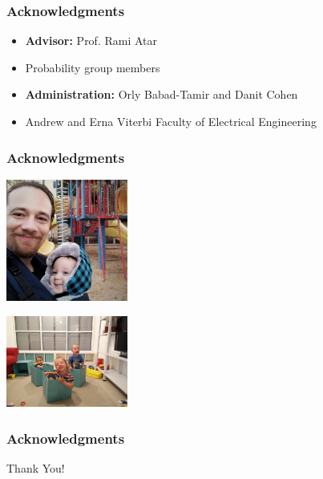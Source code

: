 \documentclass{beamer}
\begin{document}
\begin{frame}
  \frametitle{Acknowledgments}
  
\vfill
\begin{itemize}
\item {\bf Advisor:} Prof. Rami Atar
\vfill
\item Probability group members
\vfill
\item {\bf Administration:} Orly Babad-Tamir and Danit Cohen
\vfill
\item Andrew and Erna Viterbi Faculty of Electrical Engineering 
\end{itemize}  
\vfill
  
\end{frame}  


\begin{frame}
  \frametitle{Acknowledgments}

\vfill  
    \begin{center}
      \includegraphics[width=0.3\textwidth]{pictures/KfirandAdam.jpg}
    \end{center}
\vfill    
    \begin{center}
      \includegraphics[width=0.3\textwidth]{pictures/boys.jpg}
    \end{center}
\vfill
  
\end{frame}  

\begin{frame}
  \frametitle{Acknowledgments}

  \begin{center}
    \Huge Thank You!
  \end{center}
  
\end{frame}

% 
\end{document}
